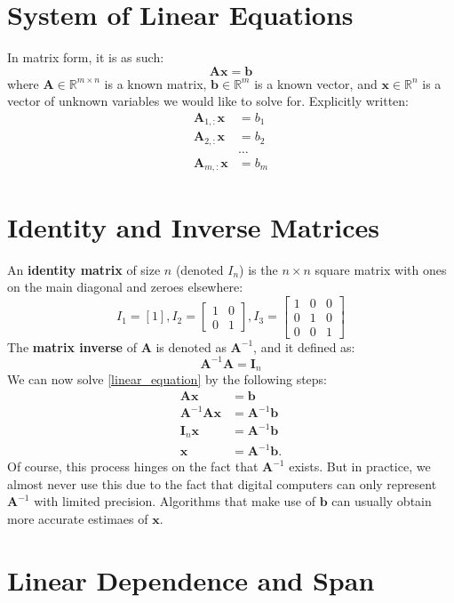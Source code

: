 \documentclass[11pt,twocolumn]{report}
\def\realnumbers{\mathbb{R}}
\begin{document}
\section{System of Linear Equations}
In matrix form, it is as such:
\begin{equation}
	\label{linear_equation}
	\bm{Ax} = \bm{b}
\end{equation}
where $\bm{A} \in \realnumbers^{m \times n}$ is a known matrix, $\bm{b} \in
\realnumbers^m$ is a known vector, and $\bm{x} \in \realnumbers^n$ is a vector
of unknown variables we would like to solve for. Explicitly written:
\begin{align}
	\bm{A}_{1, :}\bm{x} & = b_1\\
	\bm{A}_{2, :}\bm{x} & = b_2\\
	& \hdots\\
	\bm{A}_{m, :}\bm{x} & = b_m
\end{align}

\section{Identity and Inverse Matrices}
An \textbf{identity matrix} of size $n$ (denoted $I_n$)
is the $n \times n$ square matrix with ones on the main diagonal and
zeroes elsewhere:
\begin{equation*}
	I_1 = [1],
	I_2 = \begin{bmatrix}
		1 & 0\\
		0 & 1
	\end{bmatrix},
	I_3 = \begin{bmatrix}
		1 & 0 & 0\\
		0 & 1 & 0\\
		0 & 0 & 1
	\end{bmatrix}
\end{equation*}
The \textbf{matrix inverse} of $\bm{A}$ is denoted as $\bm{A}^{-1}$, and it defined as:
\begin{equation}
	\bm{A}^{-1}\bm{A} = \bm{I}_n
\end{equation}
We can now solve \ref{linear_equation} by the following steps:
\begin{align}
	\bm{Ax} & = \bm{b}\\
	\bm{A}^{-1}\bm{Ax} & = \bm{A}^{-1}\bm{b}\\
	\bm{I}_n\bm{x} & = \bm{A}^{-1}\bm{b}\\
	\bm{x} & = \bm{A}^{-1}\bm{b}.
\end{align}
Of course, this process hinges on the fact that $\bm{A}^{-1}$ exists.
But in practice, we almost never use this due to the fact that digital
computers can only represent $\bm{A}^{-1}$ with limited precision. Algorithms
that make use of $\bm{b}$ can usually obtain more accurate estimaes of
$\bm{x}$.

\section{Linear Dependence and Span}
\end{document}
